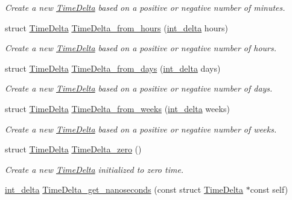 \begin{DoxyCompactItemize}
\begin{DoxyCompactList}\small\item\em \-Create a new \hyperlink{structTimeDelta}{\-Time\-Delta} based on a positive or negative number of minutes. \end{DoxyCompactList}\item 
struct \hyperlink{structTimeDelta}{\-Time\-Delta} \hyperlink{time-delta_8h_a56f1c443994cd0cbe306cd04e378eabe}{\-Time\-Delta\-\_\-from\-\_\-hours} (\hyperlink{types_8h_a10729255b1946fd4fb654b2fe814910b}{int\-\_\-delta} hours)
\begin{DoxyCompactList}\small\item\em \-Create a new \hyperlink{structTimeDelta}{\-Time\-Delta} based on a positive or negative number of hours. \end{DoxyCompactList}\item 
struct \hyperlink{structTimeDelta}{\-Time\-Delta} \hyperlink{time-delta_8h_a63cc9a37b13e1ea2c9517a15254761dd}{\-Time\-Delta\-\_\-from\-\_\-days} (\hyperlink{types_8h_a10729255b1946fd4fb654b2fe814910b}{int\-\_\-delta} days)
\begin{DoxyCompactList}\small\item\em \-Create a new \hyperlink{structTimeDelta}{\-Time\-Delta} based on a positive or negative number of days. \end{DoxyCompactList}\item 
struct \hyperlink{structTimeDelta}{\-Time\-Delta} \hyperlink{time-delta_8h_adeaef2754da892c29f03834c14ad1204}{\-Time\-Delta\-\_\-from\-\_\-weeks} (\hyperlink{types_8h_a10729255b1946fd4fb654b2fe814910b}{int\-\_\-delta} weeks)
\begin{DoxyCompactList}\small\item\em \-Create a new \hyperlink{structTimeDelta}{\-Time\-Delta} based on a positive or negative number of weeks. \end{DoxyCompactList}\item 
struct \hyperlink{structTimeDelta}{\-Time\-Delta} \hyperlink{time-delta_8h_a4d78cdef19464e2c645923c831f38910}{\-Time\-Delta\-\_\-zero} ()
\begin{DoxyCompactList}\small\item\em \-Create a new \hyperlink{structTimeDelta}{\-Time\-Delta} initialized to zero time. \end{DoxyCompactList}\item 
\hyperlink{types_8h_a10729255b1946fd4fb654b2fe814910b}{int\-\_\-delta} \hyperlink{time-delta_8h_a1c5687bfcf6d342dd152e1085e53c777}{\-Time\-Delta\-\_\-get\-\_\-nanoseconds} (const struct \hyperlink{structTimeDelta}{\-Time\-Delta} $\ast$const self)

\end{DoxyCompactItemize}
